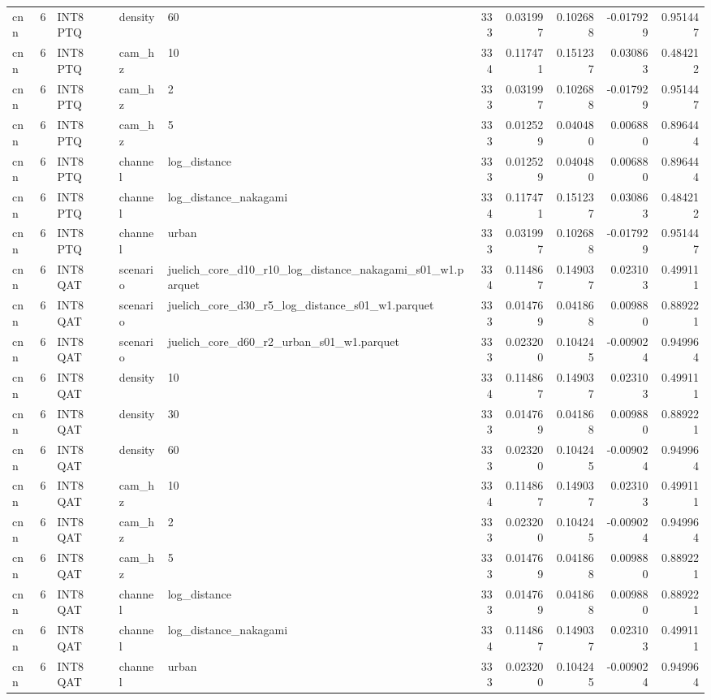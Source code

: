 \begin{tabular}{lrlllrrrrr}
cnn & 6 & INT8 PTQ & density & 60 & 333 & 0.031997 & 0.102688 & -0.017929 & 0.951447 \\
cnn & 6 & INT8 PTQ & cam\_hz & 10 & 334 & 0.117471 & 0.151237 & 0.030863 & 0.484212 \\
cnn & 6 & INT8 PTQ & cam\_hz & 2 & 333 & 0.031997 & 0.102688 & -0.017929 & 0.951447 \\
cnn & 6 & INT8 PTQ & cam\_hz & 5 & 333 & 0.012529 & 0.040480 & 0.006880 & 0.896444 \\
cnn & 6 & INT8 PTQ & channel & log\_distance & 333 & 0.012529 & 0.040480 & 0.006880 & 0.896444 \\
cnn & 6 & INT8 PTQ & channel & log\_distance\_nakagami & 334 & 0.117471 & 0.151237 & 0.030863 & 0.484212 \\
cnn & 6 & INT8 PTQ & channel & urban & 333 & 0.031997 & 0.102688 & -0.017929 & 0.951447 \\
cnn & 6 & INT8 QAT & scenario & juelich\_core\_d10\_r10\_log\_distance\_nakagami\_s01\_w1.parquet & 334 & 0.114867 & 0.149037 & 0.023103 & 0.499111 \\
cnn & 6 & INT8 QAT & scenario & juelich\_core\_d30\_r5\_log\_distance\_s01\_w1.parquet & 333 & 0.014769 & 0.041868 & 0.009880 & 0.889221 \\
cnn & 6 & INT8 QAT & scenario & juelich\_core\_d60\_r2\_urban\_s01\_w1.parquet & 333 & 0.023200 & 0.104245 & -0.009024 & 0.949964 \\
cnn & 6 & INT8 QAT & density & 10 & 334 & 0.114867 & 0.149037 & 0.023103 & 0.499111 \\
cnn & 6 & INT8 QAT & density & 30 & 333 & 0.014769 & 0.041868 & 0.009880 & 0.889221 \\
cnn & 6 & INT8 QAT & density & 60 & 333 & 0.023200 & 0.104245 & -0.009024 & 0.949964 \\
cnn & 6 & INT8 QAT & cam\_hz & 10 & 334 & 0.114867 & 0.149037 & 0.023103 & 0.499111 \\
cnn & 6 & INT8 QAT & cam\_hz & 2 & 333 & 0.023200 & 0.104245 & -0.009024 & 0.949964 \\
cnn & 6 & INT8 QAT & cam\_hz & 5 & 333 & 0.014769 & 0.041868 & 0.009880 & 0.889221 \\
cnn & 6 & INT8 QAT & channel & log\_distance & 333 & 0.014769 & 0.041868 & 0.009880 & 0.889221 \\
cnn & 6 & INT8 QAT & channel & log\_distance\_nakagami & 334 & 0.114867 & 0.149037 & 0.023103 & 0.499111 \\
cnn & 6 & INT8 QAT & channel & urban & 333 & 0.023200 & 0.104245 & -0.009024 & 0.949964 \\

\end{tabular}
